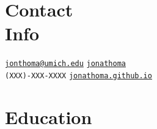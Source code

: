 \documentclass[margin,line]{resume}
\begin{document}
\begin{resume}
	\vspace{-3.5mm}
	\section{\mysidestyle Contact\\Info}
	\noindent 
		\faEnvelope \hspace{1mm} \href{mailto:jonthoma@umich.edu}{\nolinkurl{jonthoma@umich.edu}} \hfill%
		\faLinkedinSign \hspace{1mm} \href{https://linkedin.com/in/jonathoma}{\nolinkurl{jonathoma}}\\
	\noindent 
		\faPhone \hspace{1mm} \nolinkurl{(XXX)-XXX-XXXX} \hfill 
		\faUser \hspace{1mm} \href{https://jonathoma.github.io}{\nolinkurl{jonathoma.github.io}} \\ 
	\vspace{-2.5mm}
	    
	
	\sectionbreak
	\section{\mysidestyle Education}
	

\end{resume}
\end{document}
